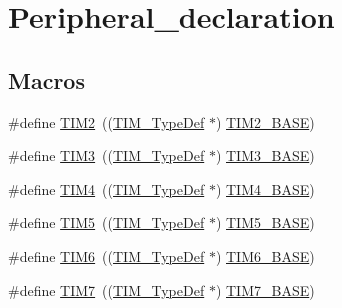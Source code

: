 \hypertarget{group___peripheral__declaration}{}\section{Peripheral\+\_\+declaration}
\label{group___peripheral__declaration}
\subsection*{Macros}
\begin{DoxyCompactItemize}
\item 
\#define \hyperlink{group___peripheral__declaration_ga3cfac9f2e43673f790f8668d48b4b92b}{T\+I\+M2}~((\hyperlink{struct_t_i_m___type_def}{T\+I\+M\+\_\+\+Type\+Def} $\ast$) \hyperlink{openmotestm_2library_2inc_2stm32f10x__map_8h_a00d0fe6ad532ab32f0f81cafca8d3aa5}{T\+I\+M2\+\_\+\+B\+A\+SE})
\item 
\#define \hyperlink{group___peripheral__declaration_ga61ee4c391385607d7af432b63905fcc9}{T\+I\+M3}~((\hyperlink{struct_t_i_m___type_def}{T\+I\+M\+\_\+\+Type\+Def} $\ast$) \hyperlink{openmotestm_2library_2inc_2stm32f10x__map_8h_af0c34a518f87e1e505cd2332e989564a}{T\+I\+M3\+\_\+\+B\+A\+SE})
\item 
\#define \hyperlink{group___peripheral__declaration_ga91a09bad8bdc7a1cb3d85cf49c94c8ec}{T\+I\+M4}~((\hyperlink{struct_t_i_m___type_def}{T\+I\+M\+\_\+\+Type\+Def} $\ast$) \hyperlink{openmotestm_2library_2inc_2stm32f10x__map_8h_a56e2d44b0002f316527b8913866a370d}{T\+I\+M4\+\_\+\+B\+A\+SE})
\item 
\#define \hyperlink{group___peripheral__declaration_ga5125ff6a23a2ed66e2e19bd196128c14}{T\+I\+M5}~((\hyperlink{struct_t_i_m___type_def}{T\+I\+M\+\_\+\+Type\+Def} $\ast$) \hyperlink{openmotestm_2library_2inc_2stm32f10x__map_8h_a3e1671477190d065ba7c944558336d7e}{T\+I\+M5\+\_\+\+B\+A\+SE})
\item 
\#define \hyperlink{group___peripheral__declaration_gac7b4ed55f9201b498b38c962cca97314}{T\+I\+M6}~((\hyperlink{struct_t_i_m___type_def}{T\+I\+M\+\_\+\+Type\+Def} $\ast$) \hyperlink{openmotestm_2library_2inc_2stm32f10x__map_8h_a8268ec947929f192559f28c6bf7d1eac}{T\+I\+M6\+\_\+\+B\+A\+SE})
\item 
\#define \hyperlink{group___peripheral__declaration_ga49267c49946fd61db6af8b49bcf16394}{T\+I\+M7}~((\hyperlink{struct_t_i_m___type_def}{T\+I\+M\+\_\+\+Type\+Def} $\ast$) \hyperlink{openmotestm_2library_2inc_2stm32f10x__map_8h_a0ebf54364c6a2be6eb19ded6b18b6387}{T\+I\+M7\+\_\+\+B\+A\+SE})

\end{DoxyCompactItemize}
